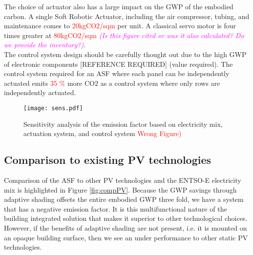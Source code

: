 The choice of actuator also has a large impact on the GWP of the embodied carbon. A single Soft Robotic Actuator, including the air compressor, tubing, and maintenance comes to \textcolor{red}{20kgCO2/sqm} per unit. A classical servo motor is four times greater at \textcolor{red}{80kgCO2/sqm} \textcolor{magenta}{\textit{(Is this figure cited or was it also calculated? Do we provide the inventory?)}}.\\

The control system design should be carefully thought out due to the high GWP of electronic components [REFERENCE REQUIRED] (value required). The control system required for an ASF where each panel can be independently actuated emits \textcolor{red}{35 \%} more CO2 as a control system where only rows are independently actuated.\\





\begin{figure}[H]
\begin{center}
\texttt{[image: sens.pdf]}
\caption{Sensitivity analysis of the emission factor based on electricity mix, actuation system, and control system \textcolor{red}{Wrong Figure)}}
\label{fig:sens}
\end{center}
\end{figure}

\subsection{Comparison to existing PV technologies}

Comparison of the ASF to other PV technologies and the ENTSO-E electricity mix is highlighted in Figure \ref{fig:compPV}. Because the GWP savings through adaptive shading offsets the entire embodied GWP three fold, we have a system that has a negative emission factor. It is this multifunctional nature of the building integrated solution that makes it superior to other technological choices. However, if the benefits of adaptive shading are not present, i.e. it is mounted on an opaque building surface, then we see an under performance to other static PV technologies. 

